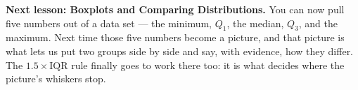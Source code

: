\documentclass[12pt]{article}
\begin{document}
\vspace{0.12in}

\boxguard[10]
\begin{spiralbox}
\small
\textbf{Next lesson: Boxplots and Comparing Distributions.} You can now pull five numbers out of
a data set --- the minimum, $Q_1$, the median, $Q_3$, and the maximum. Next time those five
numbers become a picture, and that picture is what lets us put two groups side by side and say,
with evidence, how they differ. The $1.5\times\text{IQR}$ rule finally goes to work there too:
it is what decides where the picture's whiskers stop.
\end{spiralbox}
\end{document}
